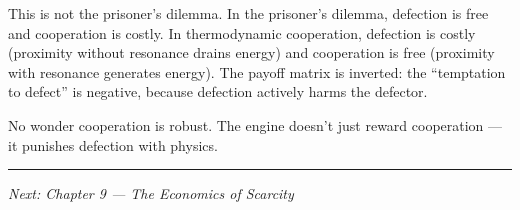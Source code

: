 This is not the prisoner's dilemma. In the prisoner's dilemma, defection is free and cooperation is costly. In thermodynamic cooperation, defection is costly (proximity without resonance drains energy) and cooperation is free (proximity with resonance generates energy). The payoff matrix is inverted: the ``temptation to defect'' is negative, because defection actively harms the defector.

No wonder cooperation is robust. The engine doesn't just reward cooperation --- it punishes defection with physics.

\begin{center}\rule{0.5\linewidth}{0.5pt}\end{center}

\emph{Next: Chapter 9 --- The Economics of Scarcity}
